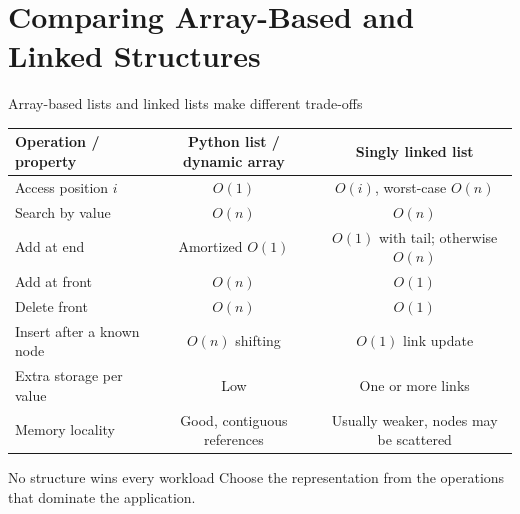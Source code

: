 \documentclass[aspectratio=169]{beamer}
\begin{document}
\section{Comparing Array-Based and Linked Structures}

\begin{frame}{Array-based lists and linked lists make different trade-offs}
\scriptsize
\begin{center}
\renewcommand{\arraystretch}{1.20}
\begin{tabular}{L{0.28\textwidth}cc}
\toprule
\textbf{Operation / property} & \textbf{Python list / dynamic array} & \textbf{Singly linked list} \\
\midrule
Access position $i$ & $O(1)$ & $O(i)$, worst-case $O(n)$ \\
Search by value & $O(n)$ & $O(n)$ \\
Add at end & Amortized $O(1)$ & $O(1)$ with tail; otherwise $O(n)$ \\
Add at front & $O(n)$ & $O(1)$ \\
Delete front & $O(n)$ & $O(1)$ \\
Insert after a known node & $O(n)$ shifting & $O(1)$ link update \\
Extra storage per value & Low & One or more links \\
Memory locality & Good, contiguous references & Usually weaker, nodes may be scattered \\
\bottomrule
\end{tabular}
\end{center}
\begin{alertblock}{No structure wins every workload}
Choose the representation from the operations that dominate the application.
\end{alertblock}
\end{frame}
\end{document}
